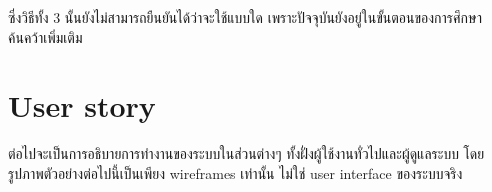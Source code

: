 ซึ่งวิธีทั้ง 3 นั้นยังไม่สามารถยืนยันได้ว่าจะใช้แบบใด เพราะปัจจุบันยังอยู่ในขั้นตอนของการศึกษาค้นคว้าเพิ่มเติม

\section{User story}
ต่อไปจะเป็นการอธิบายการทำงานของระบบในส่วนต่างๆ ทั้งฝั่งผู้ใช้งานทั่วไปและผู้ดูแลระบบ โดยรูปภาพตัวอย่างต่อไปนี้เป็นเพียง wireframes เท่านั้น ไม่ใช่ user interface ของระบบจริง
